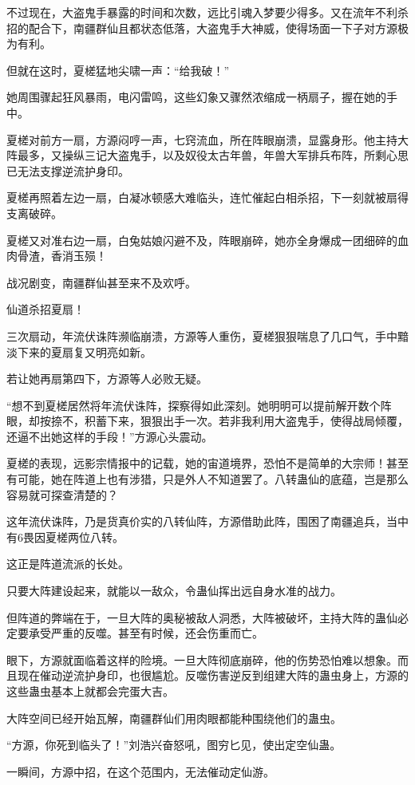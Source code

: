 \begin{this_body}
不过现在，大盗鬼手暴露的时间和次数，远比引魂入梦要少得多。又在流年不利杀招的配合下，南疆群仙且都状态低落，大盗鬼手大神威，使得场面一下子对方源极为有利。

但就在这时，夏槎猛地尖啸一声：“给我破！”

她周围骤起狂风暴雨，电闪雷鸣，这些幻象又骤然浓缩成一柄扇子，握在她的手中。

夏槎对前方一扇，方源闷哼一声，七窍流血，所在阵眼崩溃，显露身形。他主持大阵最多，又操纵三记大盗鬼手，以及奴役太古年兽，年兽大军排兵布阵，所剩心思已无法支撑逆流护身印。

夏槎再照着左边一扇，白凝冰顿感大难临头，连忙催起白相杀招，下一刻就被扇得支离破碎。

夏槎又对准右边一扇，白兔姑娘闪避不及，阵眼崩碎，她亦全身爆成一团细碎的血肉骨渣，香消玉殒！

战况剧变，南疆群仙甚至来不及欢呼。

仙道杀招夏扇！

三次扇动，年流伏诛阵濒临崩溃，方源等人重伤，夏槎狠狠喘息了几口气，手中黯淡下来的夏扇复又明亮如新。

若让她再扇第四下，方源等人必败无疑。

“想不到夏槎居然将年流伏诛阵，探察得如此深刻。她明明可以提前解开数个阵眼，却按捺不，积蓄下来，狠狠出手一次。若非我利用大盗鬼手，使得战局倾覆，还逼不出她这样的手段！”方源心头震动。

夏槎的表现，远影宗情报中的记载，她的宙道境界，恐怕不是简单的大宗师！甚至有可能，她在阵道上也有涉猎，只是外人不知道罢了。八转蛊仙的底蕴，岂是那么容易就可探查清楚的？

这年流伏诛阵，乃是货真价实的八转仙阵，方源借助此阵，围困了南疆追兵，当中有6畏因夏槎两位八转。

这正是阵道流派的长处。

只要大阵建设起来，就能以一敌众，令蛊仙挥出远自身水准的战力。

但阵道的弊端在于，一旦大阵的奥秘被敌人洞悉，大阵被破坏，主持大阵的蛊仙必定要承受严重的反噬。甚至有时候，还会伤重而亡。

眼下，方源就面临着这样的险境。一旦大阵彻底崩碎，他的伤势恐怕难以想象。而且现在催动逆流护身印，也很尴尬。反噬伤害逆反到组建大阵的蛊虫身上，方源的这些蛊虫基本上就都会完蛋大吉。

大阵空间已经开始瓦解，南疆群仙们用肉眼都能种围绕他们的蛊虫。

“方源，你死到临头了！”刘浩兴奋怒吼，图穷匕见，使出定空仙蛊。

一瞬间，方源中招，在这个范围内，无法催动定仙游。


\end{this_body}
